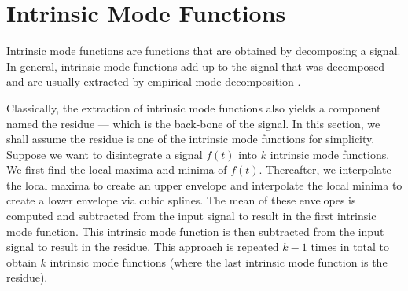 \documentclass[onecolumn, groupedaddress, 10pt]{revtex4-1}
\begin{document}

\section{Intrinsic Mode Functions}
Intrinsic mode functions are functions that are obtained by decomposing a signal. In general, intrinsic mode functions add up to the signal that was decomposed and are usually extracted by empirical mode decomposition \cite{huang1998empirical}.

Classically, the extraction of intrinsic mode functions also yields a component named the residue --- which is the back-bone of the signal. In this section, we shall assume the residue is one of the intrinsic mode functions for simplicity. Suppose we want to disintegrate a signal $f(t)$ into $k$ intrinsic mode functions. We first find the local maxima and minima of $f(t)$. Thereafter, we interpolate the local maxima to create an upper envelope and interpolate the local minima to create a lower envelope via cubic splines. The mean of these envelopes is computed and subtracted from the input signal to result in the first intrinsic mode function. This intrinsic mode function is then subtracted from the input signal to result in the residue. This approach is repeated $k-1$ times in total to obtain $k$ intrinsic mode functions (where the last intrinsic mode function is the residue).
\end{document}
